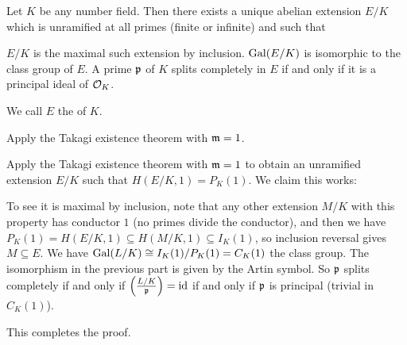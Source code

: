 \begin{dproblem}
	Let $K$ be any number field.
	Then there exists a unique abelian extension $E/K$
	which is unramified at all primes (finite or infinite)
	and such that
	\begin{itemize}
		\ii $E/K$ is the maximal such extension by inclusion.
		\ii $\operatorname{Gal}(E/K)$ is isomorphic to the class group of $E$.
		\ii A prime $\mathfrak p$ of $K$ splits completely in $E$
		if and only if it is a principal ideal of $\mathcal O_K$.
	\end{itemize}
	We call $E$ the  of $K$.
	\begin{hint}
		Apply the Takagi existence theorem with $\mathfrak m = 1$.
	\end{hint}
	\begin{sol}
		Apply the Takagi existence theorem with $\mathfrak m = 1$
		to obtain an unramified extension $E/K$ such that
		$H(E/K, 1) = P_K(1)$.
		We claim this works:
		\begin{itemize}
			\ii To see it is maximal by inclusion, note that any other extension $M/K$
			with this property has conductor $1$ (no primes divide the conductor),
			and then we have $P_K(1) = H(E/K, 1) \subseteq H(M/K, 1) \subseteq I_K(1)$,
			so inclusion reversal gives $M \subseteq E$.
			\ii We have $\operatorname{Gal}(L/K) \cong I_K(1) / P_K(1) = C_K(1)$ the class group.
			\ii The isomorphism in the previous part is given by the Artin symbol.
			So $\mathfrak p$ splits completely if and only if $\left( \frac{L/K}{\mathfrak p} \right) = \mathrm{id}$
			if and only if $\mathfrak p$ is principal (trivial in $C_K(1)$).
		\end{itemize}
		This completes the proof.
	\end{sol}
\end{dproblem}
